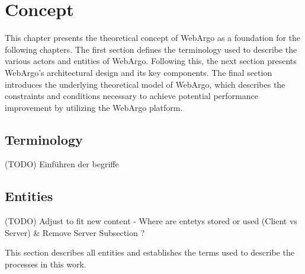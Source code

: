 \chapter{Concept}
\label{ch:concept}
This chapter presents the theoretical concept of WebArgo as a foundation for the following chapters. The first section defines the terminology used to describe the various actors and entities of WebArgo. Following this, the next section presents WebArgo's architectural design and its key components. The final section introduces the underlying theoretical model of WebArgo, which describes the constraints and conditions necessary to achieve potential performance improvement by utilizing the WebArgo platform.

\section{Terminology}
\label{sec:concept:terminology}
(TODO) Einführen der begriffe

\section{Entities}
\label{sec:methodology:entities}
(TODO) Adjust to fit new content - Where are entetys stored or used (Client vs Server) \& Remove Server Subsection ?

This section describes all entities and establishes the terms used to describe the processes in this work.


